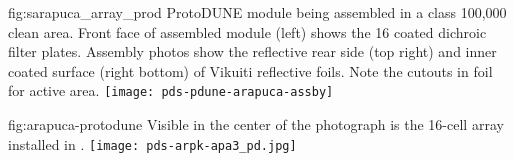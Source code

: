 
\begin{dunefigure}{fig:sarapuca_array_prod}
{ProtoDUNE  module being assembled in a class 100,000 clean area.  Front face of assembled module (left) shows the 16 coated dichroic filter plates.  Assembly photos show the reflective rear side (top right) and inner coated surface (right bottom) of Vikuiti reflective foils.  Note the cutouts in foil for  active area.}
	\texttt{[image: pds-pdune-arapuca-assby]}
\end{dunefigure}


\begin{dunefigure}{fig:arapuca-protodune}
{Visible in the center of the photograph is the 16-cell  array installed in .} 
\texttt{[image: pds-arpk-apa3\_pd.jpg]} 
\end{dunefigure}




